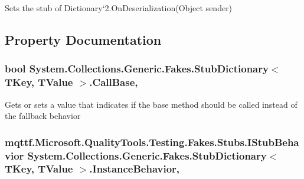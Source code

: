 Sets the stub of Dictionary`2.On\-Deserialization(\-Object sender)



\subsection{Property Documentation}
\hypertarget{class_system_1_1_collections_1_1_generic_1_1_fakes_1_1_stub_dictionary_3_01_t_key_00_01_t_value_01_4_a16e1beee895a64a1ae1dc217269d83c8}{
\subsubsection[{Call\-Base}]{\setlength{\rightskip}{0pt plus 5cm}bool System.\-Collections.\-Generic.\-Fakes.\-Stub\-Dictionary$<$ T\-Key, T\-Value $>$.Call\-Base\hspace{0.3cm}{\ttfamily [get]}, {\ttfamily [set]}}}\label{class_system_1_1_collections_1_1_generic_1_1_fakes_1_1_stub_dictionary_3_01_t_key_00_01_t_value_01_4_a16e1beee895a64a1ae1dc217269d83c8}


Gets or sets a value that indicates if the base method should be called instead of the fallback behavior

\hypertarget{class_system_1_1_collections_1_1_generic_1_1_fakes_1_1_stub_dictionary_3_01_t_key_00_01_t_value_01_4_a4a7d94749f51dbd66e00f479cd9ce081}{
\subsubsection[{Instance\-Behavior}]{\setlength{\rightskip}{0pt plus 5cm}mqttf.\-Microsoft.\-Quality\-Tools.\-Testing.\-Fakes.\-Stubs.\-I\-Stub\-Behavior System.\-Collections.\-Generic.\-Fakes.\-Stub\-Dictionary$<$ T\-Key, T\-Value $>$.Instance\-Behavior\hspace{0.3cm}{\ttfamily [get]}, {\ttfamily [set]}}}\label{class_system_1_1_collections_1_1_generic_1_1_fakes_1_1_stub_dictionary_3_01_t_key_00_01_t_value_01_4_a4a7d94749f51dbd66e00f479cd9ce081}


